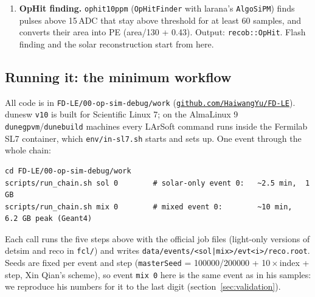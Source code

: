 \documentclass[10pt]{article}
\newcommand{\code}[1]{\texttt{#1}}
\newcommand{\us}{\,\textmu s}
\begin{document}
\begin{enumerate}[leftmargin=*]
\begin{itemize}
    channel: 62.5\,MHz (16\,ns samples), a 10\,ADC pulse per PE that decays in 0.2\us, pedestal 500, line noise
    2.6\,ADC RMS, 14 bits. To save time, it only simulates the samples around PE pulses (``focus ranges'', bug~B).
    It then mimics the DAPHNE self-trigger: when the waveform rises by more than 1.5\,PE within 10 samples, it stores
    a 320-sample snippet starting 20 samples before the trigger (bug~E). Output: \code{raw::OpDetWaveform}, the
    snippets.
  \end{itemize}
\item \textbf{OpHit finding.} \code{ophit10ppm} (\code{OpHitFinder} with larana's \code{AlgoSiPM}) finds pulses above
  15\,ADC that stay above threshold for at least 60 samples, and converts their area into PE
  (area/130 + 0.43). Output: \code{recob::OpHit}. Flash finding and the solar reconstruction start from here.
\end{enumerate}

\subsection{Running it: the minimum workflow}
\label{sec:run}
All code is in \code{FD-LE/00-op-sim-debug/work} (\href{https://github.com/HaiwangYu/FD-LE}{\code{github.com/HaiwangYu/FD-LE}}). dunesw \code{v10} is built for
Scientific Linux 7; on the AlmaLinux 9 \code{dunegpvm}/\code{dunebuild} machines every LArSoft command runs inside
the Fermilab SL7 container, which \code{env/in-sl7.sh} starts and sets up. One event through the whole chain:
\begin{lstlisting}
cd FD-LE/00-op-sim-debug/work
scripts/run_chain.sh sol 0        # solar-only event 0:   ~2.5 min,  1 GB
scripts/run_chain.sh mix 0        # mixed event 0:        ~10 min,   6.2 GB peak (Geant4)
\end{lstlisting}
Each call runs the five steps above with the official job files (light-only versions of detsim and reco in
\code{fcl/}) and writes \code{data/events/<sol|mix>/evt<i>/reco.root}. Seeds are fixed per event and step
(\code{masterSeed} = 100000/200000 + 10\,$\times$\,index + step, Xin Qian's scheme), so event \code{mix 0} here is the
same event as in his samples: we reproduce his numbers for it to the last digit (section~\ref{sec:validation}).
\end{document}
